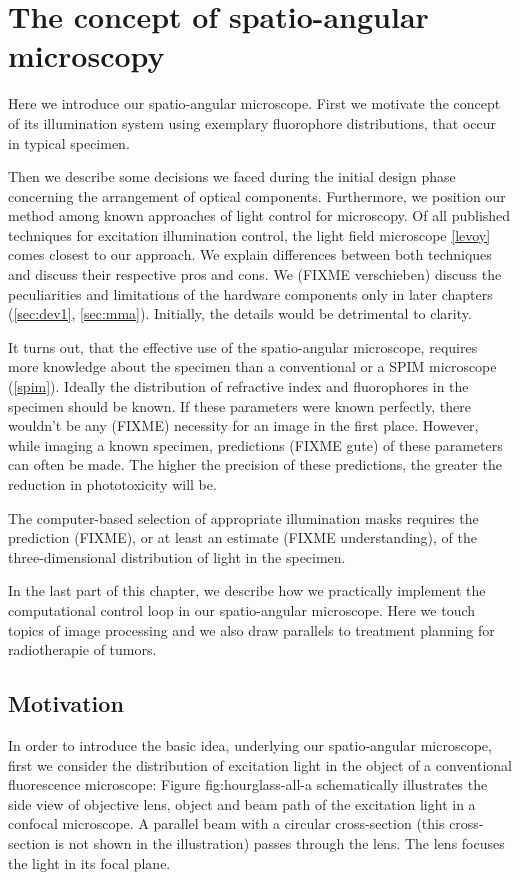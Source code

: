 \chapter{The concept of spatio-angular microscopy}
\label{sec:concept}
\begin{summary}
  Here we introduce our spatio-angular microscope. First we motivate
  the concept of its illumination system using exemplary fluorophore
  distributions, that occur in typical specimen.

  Then we describe some decisions we faced during the initial design
  phase concerning the arrangement of optical components. Furthermore,
  we position our method among known approaches of light control for
  microscopy. Of all published techniques for excitation illumination
  control, the light field microscope \ref{levoy} comes closest to our
  approach.  We explain differences between both techniques and
  discuss their respective pros and cons.  We (FIXME verschieben)
  discuss the peculiarities and limitations of the hardware components
  only in later chapters (\ref{sec:dev1}, \ref{sec:mma}).  Initially,
  the details would be detrimental to clarity.

  It turns out, that the effective use of the spatio-angular
  microscope, requires more knowledge about the specimen than a
  conventional or a SPIM microscope (\ref{spim}). Ideally the
  distribution of refractive index and fluorophores in the specimen
  should be known. If these parameters were known perfectly, there
  wouldn't be any (FIXME) necessity for an image in the first
  place. However, while imaging a known specimen, predictions (FIXME
  gute) of these parameters can often be made. The higher the
  precision of these predictions, the greater the reduction in
  phototoxicity will be.

  The computer-based selection of appropriate illumination masks
  requires the prediction (FIXME), or at least an estimate (FIXME
  understanding), of the three-dimensional distribution of light in
  the specimen.

  In the last part of this chapter, we describe how we practically
  implement the computational control loop in our spatio-angular
  microscope. Here we touch topics of image processing and we also
  draw parallels to treatment planning for radiotherapie of tumors.
\end{summary}
\section{Motivation}
In order to introduce the basic idea, underlying our spatio-angular microscope,
first we consider the distribution of excitation light in the object
of a conventional fluorescence microscope: Figure fig:hourglass-all-a
schematically illustrates the side view of objective lens, object and
beam path of the excitation light in a confocal microscope. A parallel
beam with a circular cross-section (this cross-section is not shown in
the illustration) passes through the lens. The lens focuses the light
in its focal plane.

